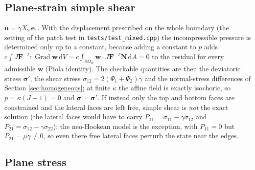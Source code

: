 \documentclass[11pt]{article}
\newcommand{\ud}{\,\mathrm{d}}
\newcommand{\Grad}{\operatorname{Grad}}
\newcommand{\bu}{\bm{u}}
\newcommand{\bw}{\bm{w}}
\newcommand{\be}{\bm{e}}
\newcommand{\bN}{\bm{N}}
\newcommand{\bsig}{\bm{\sigma}}
\newcommand{\bF}{\bm{F}}
\newcommand{\Pone}{\Psi_{1}}
\newcommand{\Ptwo}{\Psi_{2}}
\newcommand{\code}[1]{{\frenchspacing\texttt{#1}}}
\begin{document}
\subsection{Plane-strain simple shear}
$\bu = \gamma X_2\,\be_1$.  With the displacement prescribed on the whole
boundary (the setting of the patch test in \code{tests/test\_mixed.cpp})
the incompressible pressure is determined only up to a constant, because
adding a constant to $p$ adds $c\int J\bF^{-T}:\Grad\bw\ud V = c\int_{\partial\Omega_R}\bw\cdot J\bF^{-T}\bN\ud A = 0$
to the residual for every admissible $\bw$ (Piola identity).  The
checkable quantities are then the deviatoric stress $\bsig'$, the shear
stress $\sigma_{12} = 2(\Pone + \Ptwo)\gamma$ and the normal-stress
differences of Section \ref{sec:homogeneous}; at finite $\kappa$ the
affine field is exactly isochoric, so $p = \kappa(J - 1) = 0$ and
$\bsig = \bsig'$.  If instead only the top and bottom faces are constrained
and the lateral faces are left free, simple shear is \emph{not} the exact
solution (the lateral faces would have to carry $P_{11} = \sigma_{11} - \gamma\sigma_{12}$
and $P_{21} = \sigma_{12} - \gamma\sigma_{22}$); the neo-Hookean model is the
exception, with $P_{11} = 0$ but $P_{21} = \mu\gamma \ne 0$, so even there
free lateral faces perturb the state near the edges.

\subsection{Plane stress}
\label{sec:planestress}
\end{document}
